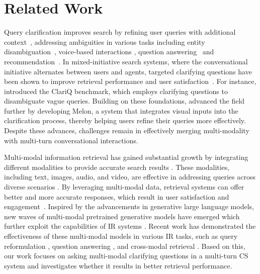 \section{Related Work}
Query clarification improves search by refining user queries with additional context~\cite{queryclarification}, addressing ambiguities in various tasks including entity disambiguation~\cite{Coden2015DidYM}, voice-based interactions \cite{10.1145/3209978.3210160}, question answering~\cite{QAclarifyingquestion} and recommendation~\cite{recommenderCQ}.
In mixed-initiative search systems, where the conversational initiative alternates between users and agents, targeted clarifying questions have been shown to improve retrieval performance and user satisfaction~\cite{rahmani-etal-2024-clarifying,DBLP:journals/corr/abs-2410-19692}. For instance, \citet{DBLP:journals/corr/abs-2009-11352} introduced the ClariQ benchmark, which employs clarifying questions to disambiguate vague queries. Building on these foundations, \citet{yuan2024askingmultimodalclarifyingquestions} advanced the field further by developing Melon, a system that integrates visual inputs into the clarification process, thereby helping users refine their queries more effectively. Despite these advances, challenges remain in effectively merging multi-modality with multi-turn conversational interactions.









 Multi-modal information retrieval has gained substantial growth by integrating different modalities to provide accurate search results \cite{MMIR}. These modalities, including text, images, audio, and video, are effective in addressing queries across diverse scenarios \cite{MMIR,yuan2024askingmultimodalclarifyingquestions}. By leveraging multi-modal data, retrieval systems can offer better and more accurate responses, which result in user satisfaction and engagement~\cite{DBLP:journals/corr/cs-IR-0311029}. Inspired by the advancements in generative large language models, new waves of multi-modal pretrained generative models have emerged which further exploit the capabilities of IR systems \cite{DBLP:journals/corr/abs-2103-00020,DBLP:journals/corr/abs-2005-09801}. Recent work has demonstrated the effectiveness of these multi-modal models in various IR tasks, such as query reformulation \cite{garg2021multimodal}, question answering \cite{Xu2019AskingCQ}, and cross-modal retrieval \cite{DBLP:journals/corr/abs-2005-09801}. Based on this, our work focuses on asking multi-modal clarifying questions in a multi-turn \ac{CS} system and investigates whether it results in better retrieval performance.